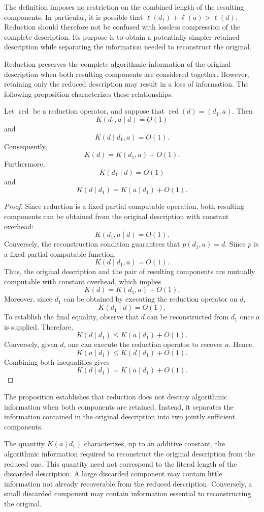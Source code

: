 The definition imposes no restriction on the combined length of the resulting components. In particular, it is possible that $\ell(d_1)+\ell(a)>\ell(d)$. Reduction should therefore not be confused with lossless compression of the complete description. Its purpose is to obtain a potentially simpler retained description while separating the information needed to reconstruct the original.

Reduction preserves the complete algorithmic information of the original description when both resulting components are considered together. However, retaining only the reduced description may result in a loss of information. The following proposition characterizes these relationships.

\begin{proposition}
\label{prop:reduction_information}
Let $\operatorname{red}$ be a reduction operator, and suppose that $\operatorname{red}(d)=(d_1,a)$. Then
\[
K(d_1,a\mid d)=O(1)
\]
and
\[
K(d\mid d_1,a)=O(1).
\]
Consequently,
\[
K(d)=K(d_1,a)+O(1).
\]
Furthermore,
\[
K(d_1\mid d)=O(1)
\]
and
\[
K(d\mid d_1)=K(a\mid d_1)+O(1).
\]
\end{proposition}
\begin{proof}
Since reduction is a fixed partial computable operation, both resulting components can be obtained from the original description with constant overhead:
\[
K(d_1,a\mid d)=O(1).
\]
Conversely, the reconstruction condition guarantees that $p(d_1,a)=d$. Since $p$ is a fixed partial computable function,
\[
K(d\mid d_1,a)=O(1).
\]
Thus, the original description and the pair of resulting components are mutually computable with constant overhead, which implies
\[
K(d)=K(d_1,a)+O(1).
\]
Moreover, since $d_1$ can be obtained by executing the reduction operator on $d$,
\[
K(d_1\mid d)=O(1).
\]
To establish the final equality, observe that $d$ can be reconstructed from $d_1$ once $a$ is supplied. Therefore,
\[
K(d\mid d_1) \leq K(a\mid d_1) + O(1).
\]
Conversely, given $d$, one can execute the reduction operator to recover $a$. Hence,
\[
K(a\mid d_1) \leq K(d\mid d_1)+O(1).
\]
Combining both inequalities gives
\[
K(d\mid d_1)=K(a\mid d_1)+O(1).
\]
\end{proof}

The proposition establishes that reduction does not destroy algorithmic information when both components are retained. Instead, it separates the information contained in the original description into two jointly sufficient components.

The quantity $K(a\mid d_1)$ characterizes, up to an additive constant, the algorithmic information required to reconstruct the original description from the reduced one. This quantity need not correspond to the literal length of the discarded description. A large discarded component may contain little information not already recoverable from the reduced description. Conversely, a small discarded component may contain information essential to reconstructing the original.

